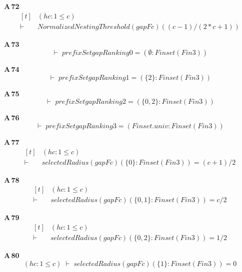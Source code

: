 \noindent\textbf{A\,72}\quad{}
{\footnotesize\[ \begin{aligned}[t]
&(\mathit{hc} : 1 \leq \mathit{c})\\
\vdash\;&\mathit{NormalizedNestingThreshold} (\mathit{gapF} \mathit{c}) ((\mathit{c} - 1) / (2 * \mathit{c} + 1))
\end{aligned} \]}

\noindent\textbf{A\,73}\quad{}
{\footnotesize\[ \vdash\; \mathit{prefixSet} \mathit{gapRanking} 0 = (\emptyset : \mathit{Finset} (\mathit{Fin} 3)) \]}

\noindent\textbf{A\,74}\quad{}
{\footnotesize\[ \vdash\; \mathit{prefixSet} \mathit{gapRanking} 1 = (\{ 2\} : \mathit{Finset} (\mathit{Fin} 3)) \]}

\noindent\textbf{A\,75}\quad{}
{\footnotesize\[ \vdash\; \mathit{prefixSet} \mathit{gapRanking} 2 = (\{ 0,2\} : \mathit{Finset} (\mathit{Fin} 3)) \]}

\noindent\textbf{A\,76}\quad{}
{\footnotesize\[ \vdash\; \mathit{prefixSet} \mathit{gapRanking} 3 = (\mathit{Finset}.\mathit{univ} : \mathit{Finset} (\mathit{Fin} 3)) \]}

\noindent\textbf{A\,77}\quad{}
{\footnotesize\[ \begin{aligned}[t]
&(\mathit{hc} : 1 \leq \mathit{c})\\
\vdash\;&\mathit{selectedRadius} (\mathit{gapF} \mathit{c}) (\{ 0\} : \mathit{Finset} (\mathit{Fin} 3)) = (\mathit{c} + 1) / 2
\end{aligned} \]}

\noindent\textbf{A\,78}\quad{}
{\footnotesize\[ \begin{aligned}[t]
&(\mathit{hc} : 1 \leq \mathit{c})\\
\vdash\;&\mathit{selectedRadius} (\mathit{gapF} \mathit{c}) (\{ 0,1\} : \mathit{Finset} (\mathit{Fin} 3)) = \mathit{c} / 2
\end{aligned} \]}

\noindent\textbf{A\,79}\quad{}
{\footnotesize\[ \begin{aligned}[t]
&(\mathit{hc} : 1 \leq \mathit{c})\\
\vdash\;&\mathit{selectedRadius} (\mathit{gapF} \mathit{c}) (\{ 0,2\} : \mathit{Finset} (\mathit{Fin} 3)) = 1 / 2
\end{aligned} \]}

\noindent\textbf{A\,80}\quad{}
{\footnotesize\[ (\mathit{hc} : 1 \leq \mathit{c}) \;\vdash\; \mathit{selectedRadius} (\mathit{gapF} \mathit{c}) (\{ 1\} : \mathit{Finset} (\mathit{Fin} 3)) = 0 \]}

